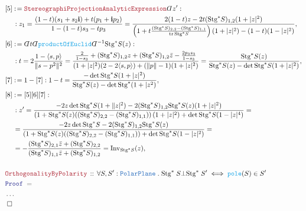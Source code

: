 \documentclass[12pt]{scrartcl}
\newcommand{\TYPE}[1]{\textcolor{NavyBlue}{\mathtt{#1}}}
\newcommand{\FUNC}[1]{\textcolor{Cerulean}{\mathtt{#1}}}
\newcommand{\LOGIC}[1]{\textcolor{Blue}{\mathtt{#1}}}
\newcommand{\THM}[1]{\textcolor{Maroon}{\mathtt{#1}}}
\renewcommand{\.}{\; . \;}
\newcommand{\de}{: \kern 0.1pc =}
\newcommand{\Theorem}[2]{& \THM{#1} \, :: \, #2 \\ & \Proof = \\ }
\newcommand{\NewLine}{\\ & \kern 1pc}
\newcommand{\Page}[1]{ \begin{align*} #1 \end{align*}   }
\newcommand{ \bd }{ \ByDef }
\newcommand{\NoProof}{ & \ldots \\ \EndProof}
\renewcommand{\i}{\mathbf{i}}
\newcommand{\Say}[3]{& #1 \de #2 : #3, \\}
\newcommand{\QED}{\; \square}
\newcommand{\EndProof}{& \QED \\}
\newcommand{\ByDef}{\rotatebox[origin=c]{-180}{$D$}}%
\newcommand{\Proof}{\LOGIC{Proof} \; }
\DeclareMathOperator{\tr}{tr}     %
\newcommand{\Inv}{\mathrm{Inv}}
\newcommand{\Stg}{\mathrm{Stg}}
\begin{document}
{{	}
}\Page{
	\Say{[5]}{\THM{StereographiProjectionAnalyticExpression}\bd z'}
	{
		\NewLine :
		z_1 = 
		\frac{(1-t)(s_1 +s_2\i) + t(p_1 + \i p_2)}{ 1 - (1-t)s_3 - t p_3  } =
		\frac{
			2 (1-t) z - 2t (\Stg^* S)_{1,2}( 1 + |z|^2)            
		}
		{
			\left(1  + t \frac{(\Stg^* S)_{2,2}-(\Stg^* S)_{1,1}}{\tr \Stg^* S}  \right)(1 + |z|^2)
			- (1 -t)(1 - |z|^2) 
		}
	}
	\Say{[6]}
	{
		\bd t \bd \FUNC{productOfEuclid} \bd^{-1} \Stg^*S(z)	
	}
	{
		\NewLine : 
		t =  2\frac{1 - \langle s,p\rangle}{\|s - p^2\|^2} = 
		\frac{ \frac{2}{1 - s_3}  + (\Stg^* S)_{1,2} z + (\Stg^* S)_{1,2} \bar z  - \frac{2p_3s_3}{1-s_3}}
		{ (1 +|z|^2)(2 -2\langle s,p\rangle)  + (\|p\| - 1)(1 + |z|^2)   } 
		=
		\frac{\Stg^* S(z)}{\Stg^* S(z) - \det \Stg^* S (1 + |z|^2) }
	}
	\Say{[7]}
	{
		1 - [7]
	}
	{
		1 - t = \frac{- \det \Stg^* S(1 + |z|^2)}{\Stg^* S(z) - \det \Stg^*(1 + |z^2)}
	}
	\Say{[8]}{[5][6][7]}
	{
		\NewLine :
		z' = 
		\frac{-2z\det \Stg^* S(1 +\|z|^2 ) - 2(\Stg^* S)_{1,2}\Stg^* S(z)(1 + |z|^2)} 
		{
			\left( 1 + \Stg^* S(z)((\Stg^* S)_{2,2} - (\Stg^* S)_{1,1}) \right)
			(1 + |z|^2)
			+ \det \Stg^* S (1 - |z|^4)
		} =
		\NewLine = 
		\frac{-2z\det \Stg^* S - 2 (\Stg^* S)_{1,2}\Stg^* S(z)} 
		{
			\left( 1 + \Stg^* S(z)((\Stg^* S)_{2,2} - (\Stg^* S)_{1,1}) \right)
			+ \det \Stg^* S (1 - |z|^2)
		} =
		\NewLine
		=
		-\frac{(\Stg^* S)_{2,1} \bar z + (\Stg^* S)_{2,2}}
		{(\Stg^* S)_{1,1}\bar z + (\Stg^* S)_{1,2}} 
		=
		\Inv_{\Stg^* S}(z)
	}
	\\
	\Theorem{OrthogonalityByPolarity}
	{
		\forall S,S' : \TYPE{PolarPlane} \.
		\Stg^* \; S \bot \Stg^*\; S'
		\iff
		\FUNC{pole}(S) \in S'
	}
	\NoProof
}
\newpage
\end{document}
